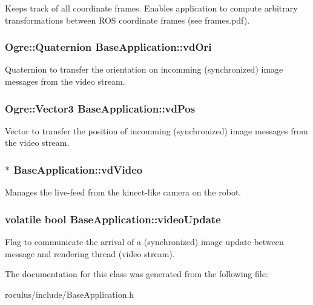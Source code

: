 \-Keeps track of all coordinate frames. \-Enables application to compute arbitrary transformations between \-R\-O\-S coordinate frames (see frames.\-pdf). \hypertarget{classBaseApplication_ae855031951285ecc5c368fca44af62d5}{
\subsubsection[{vd\-Ori}]{\setlength{\rightskip}{0pt plus 5cm}\-Ogre\-::\-Quaternion {\bf \-Base\-Application\-::vd\-Ori}}}\label{classBaseApplication_ae855031951285ecc5c368fca44af62d5}
\-Quaternion to transfer the orientation on incomming (synchronized) image messages from the video stream. \hypertarget{classBaseApplication_adec41f9fd119d45e6594749a0147334d}{
\subsubsection[{vd\-Pos}]{\setlength{\rightskip}{0pt plus 5cm}\-Ogre\-::\-Vector3 {\bf \-Base\-Application\-::vd\-Pos}}}\label{classBaseApplication_adec41f9fd119d45e6594749a0147334d}
\-Vector to transfer the position of incomming (synchronized) image messages from the video stream. \hypertarget{classBaseApplication_a3768ce4e283c7cc09b78adba043024be}{
\subsubsection[{vd\-Video}]{$\ast$ {\bf \-Base\-Application\-::vd\-Video}}}\label{classBaseApplication_a3768ce4e283c7cc09b78adba043024be}
\-Manages the live-\/feed from the kinect-\/like camera on the robot. \hypertarget{classBaseApplication_abbf6dd8d322875c5dc66d4eaee58049d}{
\subsubsection[{video\-Update}]{\setlength{\rightskip}{0pt plus 5cm}volatile bool {\bf \-Base\-Application\-::video\-Update}}}\label{classBaseApplication_abbf6dd8d322875c5dc66d4eaee58049d}
\-Flag to communicate the arrival of a (synchronized) image update between message and rendering thread (video stream). 

\-The documentation for this class was generated from the following file\-:\begin{DoxyCompactItemize}
\item 
roculus/include/\-Base\-Application.\-h\end{DoxyCompactItemize}
